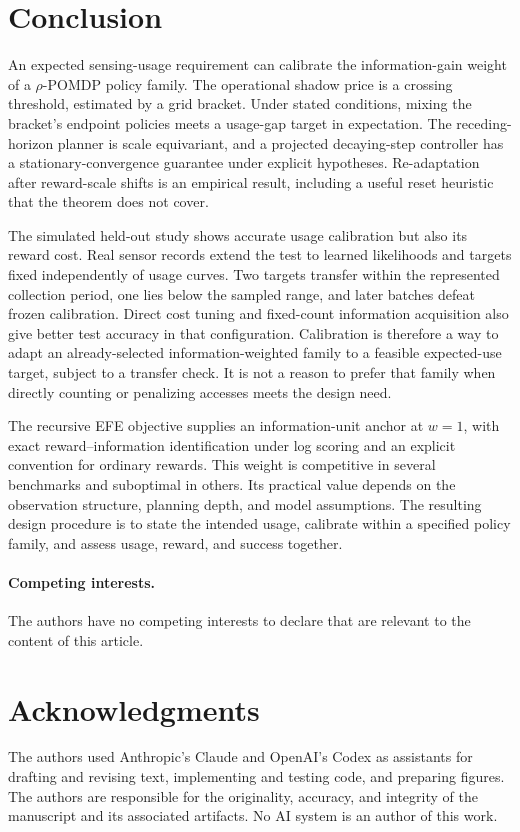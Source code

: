 \documentclass[runningheads]{llncs}
\begin{document}
\section{Conclusion}

An expected sensing-usage requirement can calibrate the information-gain weight of a $\rho$-POMDP policy family. The operational shadow price is a crossing threshold, estimated by a grid bracket. Under stated conditions, mixing the bracket's endpoint policies meets a usage-gap target in expectation. The receding-horizon planner is scale equivariant, and a projected decaying-step controller has a stationary-convergence guarantee under explicit hypotheses. Re-adaptation after reward-scale shifts is an empirical result, including a useful reset heuristic that the theorem does not cover.

The simulated held-out study shows accurate usage calibration but also its reward cost. Real sensor records extend the test to learned likelihoods and targets fixed independently of usage curves. Two targets transfer within the represented collection period, one lies below the sampled range, and later batches defeat frozen calibration. Direct cost tuning and fixed-count information acquisition also give better test accuracy in that configuration. Calibration is therefore a way to adapt an already-selected information-weighted family to a feasible expected-use target, subject to a transfer check. It is not a reason to prefer that family when directly counting or penalizing accesses meets the design need.

The recursive EFE objective supplies an information-unit anchor at $w=1$, with exact reward--information identification under log scoring and an explicit convention for ordinary rewards. This weight is competitive in several benchmarks and suboptimal in others. Its practical value depends on the observation structure, planning depth, and model assumptions. The resulting design procedure is to state the intended usage, calibrate within a specified policy family, and assess usage, reward, and success together.

\paragraph{Competing interests.} The authors have no competing interests to declare that are relevant to the content of this article.

\section*{Acknowledgments}
The authors used Anthropic's Claude and OpenAI's Codex as assistants for drafting and revising text, implementing and testing code, and preparing figures. The authors are responsible for the originality, accuracy, and integrity of the manuscript and its associated artifacts. No AI system is an author of this work.
\end{document}
